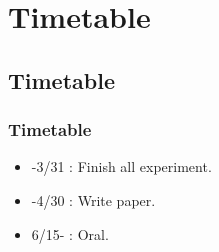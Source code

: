 \section{Timetable}

\subsection{Timetable}
\begin{frame}
    \frametitle{Timetable}
	\begin{itemize}
		\item -3/31 : Finish all experiment. 
		\item -4/30 : Write paper. 
		\item 6/15- : Oral. 
	\end{itemize}
\end{frame}


